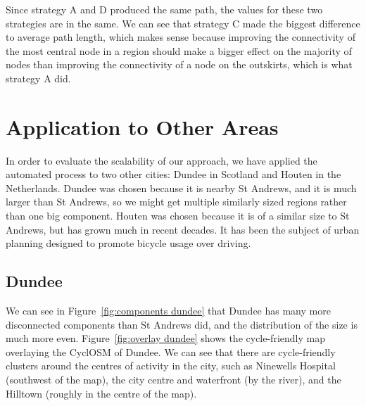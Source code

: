 \documentclass[12pt,a4paper]{report}
\begin{document}
Since strategy A and D produced the same path, the values for these two strategies are in the same. We can see that strategy C made the biggest difference to average path length, which makes sense because improving the connectivity of the most central node in a region should make a bigger effect on the majority of nodes than improving the connectivity of a node on the outskirts, which is what strategy A did.

\section{Application to Other Areas}
In order to evaluate the scalability of our approach, we have applied the automated process to two other cities: Dundee in Scotland and Houten in the Netherlands. Dundee was chosen because it is nearby St Andrews, and it is much larger than St Andrews, so we might get multiple similarly sized regions rather than one big component. Houten was chosen because it is of a similar size to St Andrews, but has grown much in recent decades. It has been the subject of urban planning designed to promote bicycle usage over driving.

\subsection{Dundee}\label{sec:dundee}
We can see in Figure~\ref{fig:components dundee} that Dundee has many more disconnected components than St Andrews did, and the distribution of the size is much more even. Figure~\ref{fig:overlay dundee} shows the cycle-friendly map overlaying the CyclOSM of Dundee. We can see that there are cycle-friendly clusters around the centres of activity in the city, such as Ninewells Hospital (southwest of the map), the city centre and waterfront (by the river), and the Hilltown (roughly in the centre of the map).
\end{document}
